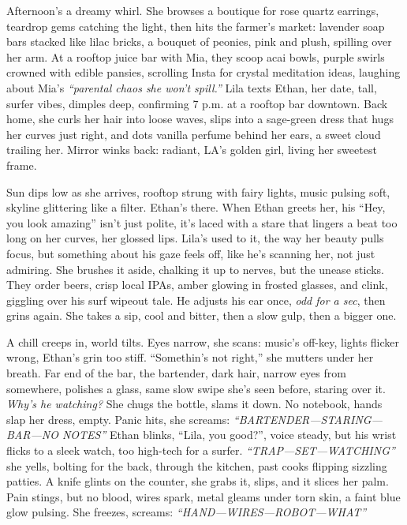 \documentclass[12pt]{article} %
\begin{document}
Afternoon’s a dreamy whirl. She browses a boutique for rose quartz earrings, teardrop gems catching the light, then hits the farmer’s market: lavender soap bars stacked like lilac bricks, a bouquet of peonies, pink and plush, spilling over her arm. At a rooftop juice bar with \textnormal{Mia}, they scoop acai bowls, purple swirls crowned with edible pansies, scrolling Insta for crystal meditation ideas, laughing about \textnormal{Mia}’s \textit{“parental chaos she won’t spill.”} \textnormal{Lila} texts \textnormal{Ethan}, her date, tall, surfer vibes, dimples deep, confirming 7 p.m. at a rooftop bar downtown. Back home, she curls her hair into loose waves, slips into a sage-green dress that hugs her curves just right, and dots vanilla perfume behind her ears, a sweet cloud trailing her. Mirror winks back: radiant, LA’s golden girl, living her sweetest frame.

Sun dips low as she arrives, rooftop strung with fairy lights, music pulsing soft, skyline glittering like a filter. \textnormal{Ethan}’s there. When \textnormal{Ethan} greets her, his “Hey, you look amazing” isn’t just polite, it’s laced with a stare that lingers a beat too long on her curves, her glossed lips. \textnormal{Lila}’s used to it, the way her beauty pulls focus, but something about his gaze feels off, like he’s scanning her, not just admiring. She brushes it aside, chalking it up to nerves, but the unease sticks. They order beers, crisp local IPAs, amber glowing in frosted glasses, and clink, giggling over his surf wipeout tale. He adjusts his ear once, \textit{odd for a sec}, then grins again. She takes a sip, cool and bitter, then a slow gulp, then a bigger one.

A chill creeps in, world tilts. Eyes narrow, she scans: music’s off-key, lights flicker wrong, \textnormal{Ethan}’s grin too stiff. “Somethin’s not right,” she mutters under her breath. Far end of the bar, the bartender, dark hair, narrow eyes from somewhere, polishes a glass, same slow swipe she’s seen before, staring over it. \textit{Why’s he watching?} She chugs the bottle, slams it down. No notebook, hands slap her dress, empty. Panic hits, she screams: \textit{“BARTENDER—STARING—BAR—NO NOTES”} \textnormal{Ethan} blinks, “Lila, you good?”, voice steady, but his wrist flicks to a sleek watch, too high-tech for a surfer. \textit{“TRAP—SET—WATCHING”} she yells, bolting for the back, through the kitchen, past cooks flipping sizzling patties. A knife glints on the counter, she grabs it, slips, and it slices her palm. Pain stings, but no blood, wires spark, metal gleams under torn skin, a faint blue glow pulsing. She freezes, screams: \textit{“HAND—WIRES—ROBOT—WHAT”}
\end{document}
